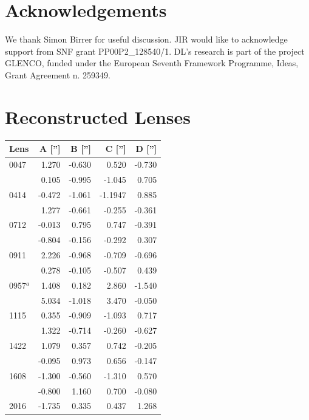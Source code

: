 \documentclass[useAMS,usenatbib]{mn2e}
\begin{document}
\section{Acknowledgements}\label{sec:acknowledgements}
We thank Simon Birrer for useful discussion. JIR would like to acknowledge support from SNF grant PP00P2\_128540/1. DL's research is part of the project GLENCO, funded under the European Seventh Framework Programme, Ideas, Grant Agreement n. 259349.






\appendix
\section{Reconstructed Lenses}\label{sec:reconstructions}
\begin{table}
  \begin{center}
    \begin{tabular}{l r r r r}
      Lens & A [''] & B [''] & C [''] & D [''] \\ \hline
      0047 & 1.270 & -0.630 & 0.520 & -0.730 \\
           & 0.105 & -0.995 & -1.045 & 0.705 \\
      0414 & -0.472 & -1.061 & -1.1947 & 0.885 \\
           & 1.277 & -0.661 & -0.255 & -0.361 \\
      0712 & -0.013 & 0.795 & 0.747 & -0.391 \\
           & -0.804 & -0.156 & -0.292 & 0.307 \\
      0911 & 2.226 & -0.968 & -0.709 & -0.696 \\
           & 0.278 & -0.105 & -0.507 & 0.439 \\
      0957$^{a}$ & 1.408 & 0.182 & 2.860 & -1.540 \\
           & 5.034 & -1.018 & 3.470 & -0.050 \\
      1115 & 0.355 & -0.909 & -1.093 & 0.717 \\
           & 1.322 & -0.714 & -0.260 & -0.627 \\
      1422 & 1.079 & 0.357 & 0.742 & -0.205 \\
           & -0.095 & 0.973 & 0.656 & -0.147 \\
      1608 & -1.300 & -0.560 & -1.310 & 0.570 \\
           & -0.800 & 1.160 & 0.700 & -0.080 \\
      2016 & -1.735 & 0.335 & 0.437 & 1.268 \\

\end{tabular}
\end{center}
\end{table}
\end{document}

